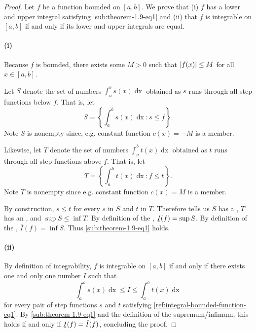 \documentclass{report}
\begin{document}
\begin{proof}

  Let $f$ be a function bounded on $[a, b]$.
  We prove that (i) $f$ has a lower and upper integral satisfying
    \eqref{sub:theorem-1.9-eq1} and (ii) that $f$ is integrable on $[a, b]$ if
    and only if its lower and upper integrals are equal.

  \paragraph{(i)}%

    Because $f$ is bounded, there exists some $M > 0$ such that
      $\left|f(x)\right| \leq M$ for all $x \in [a, b]$.

    Let $S$ denote the set of numbers $\int_a^b s(x) \mathop{dx}$ obtained as
      $s$ runs through all step functions below $f$.
    That is, let $$S = \left\{ \int_a^b s(x) \mathop{dx} : s \leq f \right\}.$$
    Note $S$ is nonempty since, e.g. constant function $c(x) = -M$ is a member.

    Likewise, let $T$ denote the set of numbers $\int_a^b t(x) \mathop{dx}$
      obtained as $t$ runs through all step functions above $f$.
    That is, let $$T = \left\{ \int_a^b t(x) \mathop{dx} : f \leq t \right\}.$$
    Note $T$ is nonempty since e.g. constant function $c(x) = M$ is a member.

    By construction, $s \leq t$ for every $s$ in $S$ and $t$ in $T$.
    Therefore  tells us $S$ has a
      , $T$ has an , and
      $\sup{S} \leq \inf{T}$.
    By definition of the , $\ubar{I}(f) = \sup{S}$.
    By definition of the , $\bar{I}(f) = \inf{S}$.
    Thus \eqref{sub:theorem-1.9-eq1} holds.

  \paragraph{(ii)}%

    By definition of integrability, $f$ is integrable on $[a, b]$ if and only if
      there exists one and only one number $I$ such that
      $$\int_a^b s(x) \mathop{dx} \leq I \leq \int_a^b t(x) \mathop{dx}$$
      for every pair of step functions $s$ and $t$ satisfying
      \eqref{ref:integral-bounded-function-eq1}.
    By \eqref{sub:theorem-1.9-eq1} and the definition of the supremum/infimum,
      this holds if and only if $\ubar{I}(f) = \bar{I}(f)$, concluding the
      proof.

\end{proof}
\end{document}
